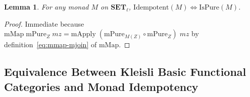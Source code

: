 \documentclass[11pt,a4paper]{article}
\newtheorem{lemma}[theorem]{Lemma}
\theoremstyle{definition}
\theoremstyle{remark}
\newcommand{\Set}{\mathbf{SET}}
\begin{document}
\begin{lemma}\label{lem:idem-ispure}
For any monad $M$ on $\Set_\ell$, $\mathrm{Idempotent}(M) \iff \mathrm{IsPure}(M)$.
\end{lemma}

\begin{proof}
Immediate because $\mathrm{mMap}\;\mathrm{mPure}_Z\;mz =
\mathrm{mApply}\;(\mathrm{mPure}_{M(Z)} \circ \mathrm{mPure}_Z)\;mz$ by definition~\eqref{eq:mmap-mjoin}
of $\mathrm{mMap}$.
\end{proof}

\subsection{Equivalence Between Kleisli Basic Functional Categories and Monad Idempotency}
\end{document}

